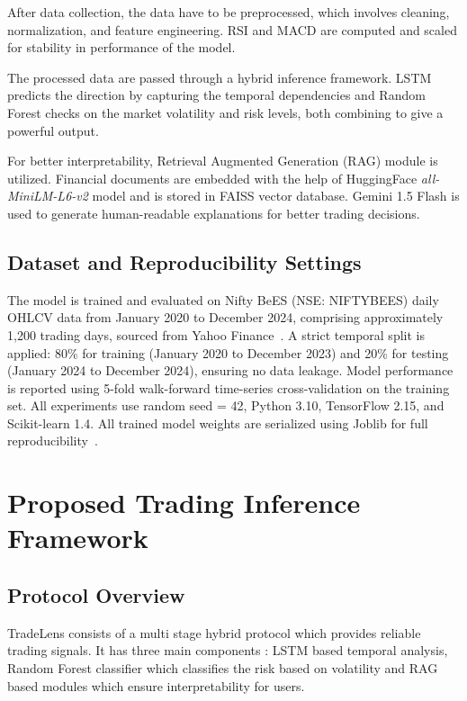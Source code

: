 \documentclass[twocolumn]{article}
\begin{document}
After data collection, the data have to be preprocessed, which involves cleaning, normalization, and feature engineering. RSI and MACD are computed and scaled for stability in performance of the model.

The processed data are passed through a hybrid inference framework. LSTM predicts the direction by capturing the temporal dependencies and Random Forest checks on the market volatility and risk levels, both combining to give a powerful output.

For better interpretability, Retrieval Augmented Generation (RAG) module is utilized. Financial documents are embedded with the help of HuggingFace \textit{all-MiniLM-L6-v2} model and is stored in FAISS vector database. Gemini 1.5 Flash is used to generate human-readable explanations for better trading decisions.

\subsection{Dataset and Reproducibility Settings}

The model is trained and evaluated on Nifty BeES (NSE: NIFTYBEES) daily OHLCV data from January 2020 to December 2024, comprising approximately 1,200 trading days, sourced from Yahoo Finance~\cite{yahoofinance2024}. A strict temporal split is applied: 80\% for training (January 2020 to December 2023) and 20\% for testing (January 2024 to December 2024), ensuring no data leakage. Model performance is reported using 5-fold walk-forward time-series cross-validation on the training set. All experiments use random seed = 42, Python 3.10, TensorFlow 2.15, and Scikit-learn 1.4. All trained model weights are serialized using Joblib for full reproducibility~\cite{amruth2025stock}.

\section{Proposed Trading Inference Framework}

\subsection{Protocol Overview}

TradeLens consists of a multi stage hybrid protocol which provides reliable trading signals. It has three main components : LSTM based temporal analysis, Random Forest classifier which classifies the risk based on volatility and RAG based modules which ensure interpretability for users. 
\end{document}
